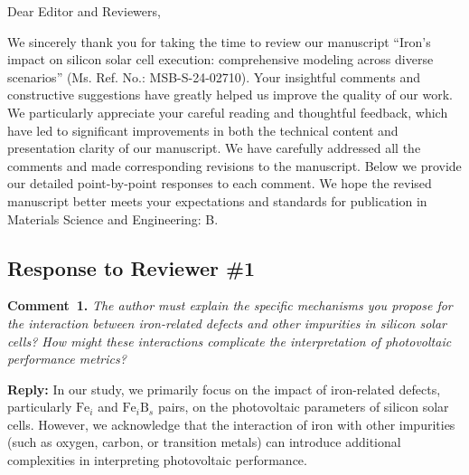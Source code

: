 \documentclass[a4paper,fleqn]{cas-sc}
\begin{document}
\shorttitle{}


%


Dear Editor and Reviewers,

We sincerely thank you for taking the time to review our manuscript
``Iron's impact on silicon solar cell execution: comprehensive modeling across diverse scenarios''
(Ms. Ref. No.: MSB-S-24-02710).
Your insightful comments and constructive suggestions have greatly helped us improve
the quality of our work.
We particularly appreciate your careful reading and thoughtful feedback, which have
led to significant improvements in both the technical content and presentation clarity of our manuscript.
We have carefully addressed all the comments and made corresponding revisions to the manuscript.
Below we provide our detailed point-by-point responses to
each comment.
We hope the revised manuscript better meets your expectations and standards for publication in Materials Science and Engineering: B.


\subsection*{Response to Reviewer \#1 }

\noindent
\textcolor[rgb]{0.00,0.50,1.00}{\textbf{Comment~1.}}
\emph{The author must explain the specific mechanisms you propose for the interaction between iron-related defects and other impurities in silicon solar cells? How might these interactions complicate the interpretation of photovoltaic performance metrics?}

\noindent
\textcolor[rgb]{0.51,0.00,0.00}{\textbf{Reply:}}
In our study, we primarily focus on the impact of iron-related defects, particularly $\mathrm{Fe}_i$ and $\mathrm{Fe}_i\mathrm{B}_s$ pairs, on the photovoltaic parameters of silicon solar cells. However, we acknowledge that the interaction of iron with other impurities (such as oxygen, carbon, or transition metals) can introduce additional complexities in interpreting photovoltaic performance.
\end{document}

